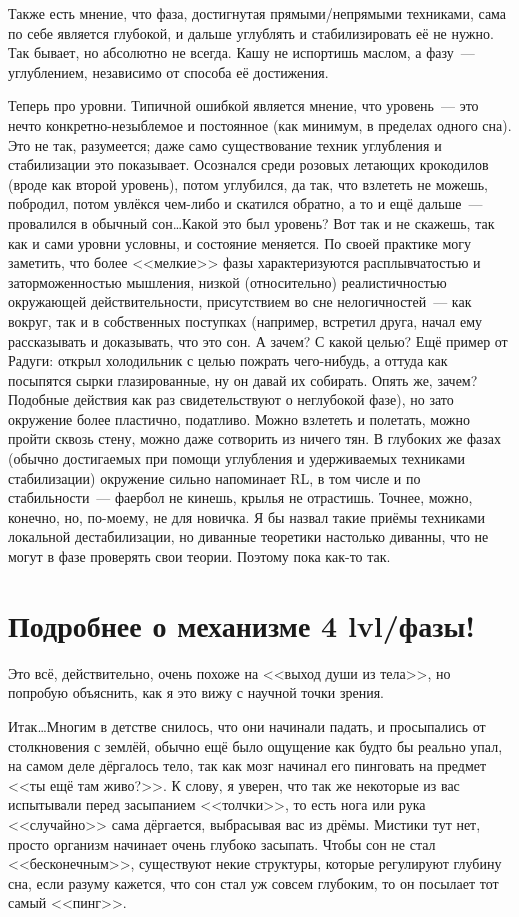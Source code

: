 \documentclass[a4paper,14pt,oneside]{memoir}
\begin{document}
Также есть мнение, что фаза, достигнутая прямыми/непрямыми техниками, сама по себе является глубокой, и дальше углублять и стабилизировать её не нужно. Так бывает, но абсолютно не всегда. Кашу не испортишь маслом, а фазу~--- углублением, независимо от способа её достижения.

Теперь про уровни. Типичной ошибкой является мнение, что уровень~--- это нечто конкретно-незыблемое и постоянное (как минимум, в пределах одного сна). Это не так, разумеется; даже само существование техник углубления и стабилизации это показывает. Осознался среди розовых летающих крокодилов (вроде как второй уровень), потом углубился, да так, что взлететь не можешь, побродил, потом увлёкся чем-либо и скатился обратно, а то и ещё дальше~--- провалился в обычный сон\ldots Какой это был уровень? Вот так и не скажешь, так как и сами уровни условны, и состояние меняется. По своей практике могу заметить, что более <<мелкие>> фазы характеризуются расплывчатостью и заторможенностью мышления, низкой (относительно) реалистичностью окружающей действительности, присутствием во сне нелогичностей~--- как вокруг, так и в собственных поступках (например, встретил друга, начал ему рассказывать и доказывать, что это сон. А зачем? С какой целью? Ещё пример от Радуги: открыл холодильник с целью пожрать чего-нибудь, а оттуда как посыпятся сырки глазированные, ну он давай их собирать. Опять же, зачем? Подобные действия как раз свидетельствуют о неглубокой фазе), но зато окружение более пластично, податливо. Можно взлететь и полетать, можно пройти сквозь стену, можно даже сотворить из ничего тян. В глубоких же фазах (обычно достигаемых при помощи углубления и удерживаемых техниками стабилизации) окружение сильно напоминает RL, в том числе и по стабильности~--- фаербол не кинешь, крылья не отрастишь. Точнее, можно, конечно, но, по-моему, не для новичка. Я бы назвал такие приёмы техниками локальной дестабилизации, но диванные теоретики настолько диванны, что не могут в фазе проверять свои теории. Поэтому пока как-то так.




\section{Подробнее о механизме 4 lvl/фазы!}  
Это всё, действительно, очень похоже на <<выход души из тела>>, но попробую объяснить, как я это вижу с научной точки зрения.

Итак\ldots Многим в детстве снилось, что они начинали падать, и просыпались от столкновения с землёй, обычно ещё было ощущение как будто бы реально упал, на самом деле дёргалось тело, так как мозг начинал его пинговать на предмет <<ты ещё там живо?>>. К слову, я уверен, что так же некоторые из вас испытывали перед засыпанием <<толчки>>, то есть нога или рука <<случайно>> сама дёргается, выбрасывая вас из дрёмы. Мистики тут нет, просто организм начинает очень глубоко засыпать. Чтобы сон не стал <<бесконечным>>, существуют некие структуры, которые регулируют глубину сна, если разуму кажется, что сон стал уж совсем глубоким, то он посылает тот самый <<пинг>>.
\end{document}
